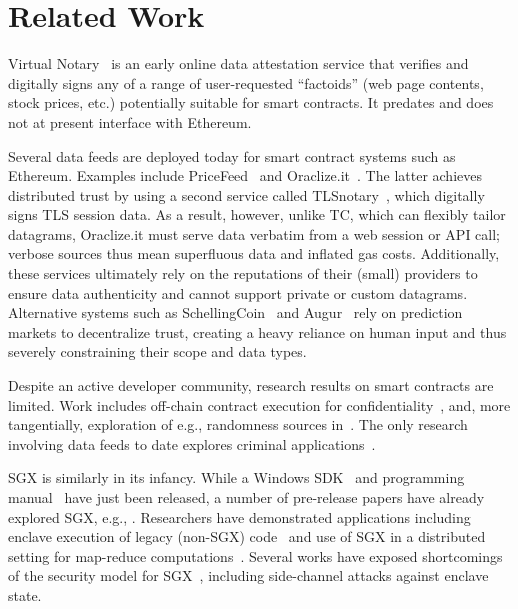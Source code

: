 \section{Related Work}
\label{sec:related}

Virtual Notary~\cite{VN:2013,VN:2016} is an early online data attestation service that verifies and digitally signs any of a range of user-requested ``factoids'' (web page contents, stock prices, etc.) potentially suitable for smart contracts. It predates and does not at present interface with Ethereum.

Several data feeds are deployed today for smart contract systems such as Ethereum. Examples include PriceFeed~\cite{PriceFeed:2016} and Oraclize.it~\cite{Oraclize:2016}. The latter achieves distributed trust by using a second service called TLSnotary~\cite{TLSnotary}, which digitally signs TLS session data. As a result, however, unlike TC, which can flexibly tailor datagrams, Oraclize.it must serve data verbatim from a web session or API call; verbose sources thus mean superfluous data and inflated gas costs. Additionally, these services  ultimately rely on the reputations of their (small) providers to ensure data authenticity and cannot support private or custom datagrams. Alternative systems such as SchellingCoin~\cite{schellingcoin} and Augur~\cite{augur} rely on prediction markets to decentralize trust, creating a heavy reliance on human input and thus severely constraining their scope and data types.  


Despite an active developer community, research results on smart contracts are limited. Work includes off-chain contract execution for confidentiality~\cite{hawk}, and, more tangentially, exploration of e.g., randomness sources in~\cite{bonneau2015bitcoin}. The only research involving data feeds to date explores criminal applications~\cite{gyges}.

SGX is similarly in its infancy.
While a Windows SDK~\cite{sgxsdk} and programming manual~\cite{sgxmanual} have just been released, a number of pre-release papers have already explored SGX, e.g., \cite{VC3,7163052,anati2013innovative,McKeen:2013jv,Phegade:2013km}. Researchers have demonstrated applications including enclave execution of legacy (non-SGX) code~\cite{haven} and use of SGX in a distributed setting for map-reduce computations~\cite{VC3}. Several works have exposed shortcomings of the security model for SGX~\cite{sgxexplained,sgxsok,shihardwaretalk}, including side-channel attacks against enclave state. 


